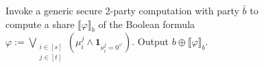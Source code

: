 \begin{figure}
{{\begin{algorithmic}[1]
    \State Invoke a generic secure 2-party computation with party $\bar{b}$ to compute a share $\llbracket \varphi\rrbracket_b$ of the Boolean formula $\varphi:=\bigvee_{\substack{i\in[s]\\j\in[t]}}\left(\mu_i^j\land \textbf{1}_{\nu_i^j = 0^{s'}}\right)$.
    \State Output $b\oplus \llbracket \varphi\rrbracket_b$.
    \EndIf
    \EndIndent
    \end{algorithmic}}}
  \end{figure}

 
    
